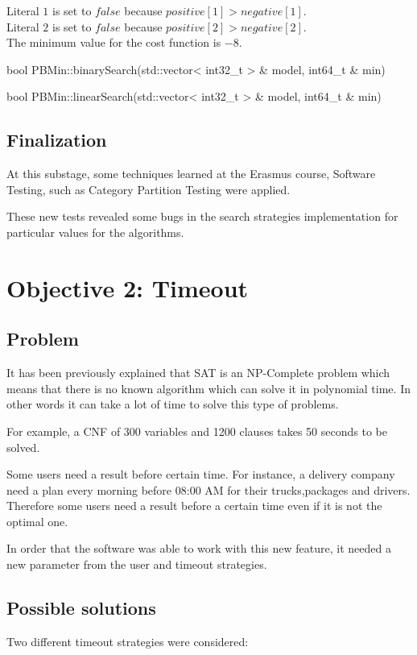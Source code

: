 Literal $1$ is set to $false$ because $positive[1] > negative[1]$.\\
Literal $2$ is set to $false$ because $positive[2] > negative[2]$.\\
The minimum value for the cost function is $-8$.


bool PBMin::binarySearch(std::vector< int32\_t > \& model, int64\_t \& min) 


bool PBMin::linearSearch(std::vector< int32\_t > \& model, int64\_t \& min) 

\subsection{Finalization}

At this substage, some techniques learned at the Erasmus course, Software Testing, such as Category Partition Testing were applied.  


These new tests revealed some bugs in the search strategies implementation for particular values for the algorithms. 


\section{Objective 2: Timeout}

\subsection{Problem}
It has been previously explained that SAT is an NP-Complete problem which means that there is no known algorithm which can solve it in polynomial time. In other words it can take a lot of time to solve this type of problems. 

For example, a CNF of 300 variables and 1200 clauses takes 50 seconds to be solved.  

Some users need a result before certain time. For instance, a delivery company need a plan every morning before 08:00 AM for their trucks,packages and drivers. Therefore some users need a result before a certain time even if it is not the optimal one.  

In order that the software was able to work with this new feature, it needed a new parameter from the user and timeout strategies.

\subsection{Possible solutions}
Two different timeout strategies were considered:  


